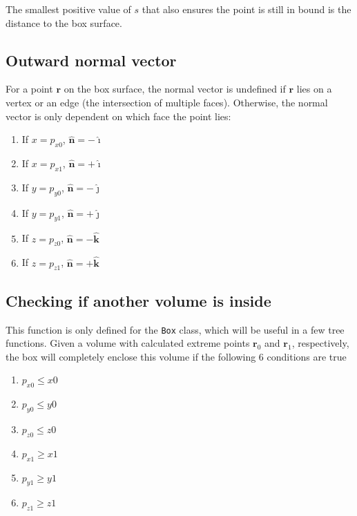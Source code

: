 The smallest positive value of $s$ that also ensures the point is still in bound is the distance to the box surface.

\subsection{Outward normal vector}
For a point $\bm{r}$ on the box surface, the normal vector is undefined if $\bm{r}$ lies on a vertex or an edge (the intersection of multiple faces). Otherwise,
the normal vector is only dependent on which face the point lies:
\begin{enumerate}
    \item If $x = p_{x0}$, $\bm{\hat{n}} = -\bm{\hat{\imath}}$
    \item If $x = p_{x1}$, $\bm{\hat{n}} = +\bm{\hat{\imath}}$
    \item If $y = p_{y0}$, $\bm{\hat{n}} = -\bm{\hat{\jmath}}$
    \item If $y = p_{y1}$, $\bm{\hat{n}} = +\bm{\hat{\jmath}}$
    \item If $z = p_{z0}$, $\bm{\hat{n}} = -\bm{\hat{k}}$
    \item If $z = p_{z1}$, $\bm{\hat{n}} = +\bm{\hat{k}}$
\end{enumerate}

\subsection{Checking if another volume is inside}
This function is only defined for the \lstinline|Box| class, which will be useful in a few tree functions. Given a volume with calculated extreme points $\bm{r}_0$ and $\bm{r}_1$, respectively, the box will completely
enclose this volume if the following 6 conditions are true
\begin{enumerate}
    \item $p_{x0} \leq x0$
    \item $p_{y0} \leq y0$
    \item $p_{z0} \leq z0$
    \item $p_{x1} \geq x1$
    \item $p_{y1} \geq y1$
    \item $p_{z1} \geq z1$
\end{enumerate}